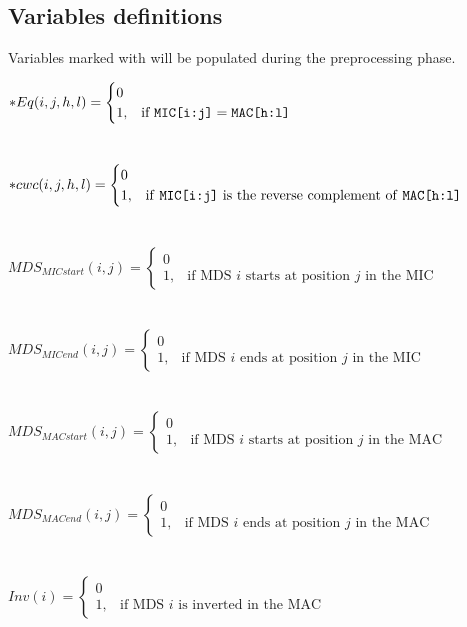 \subsection{Variables definitions}
Variables marked with \* will be populated during the preprocessing phase.

$*Eq(i,j,h,l) = \begin{cases} 0 \\ 1, & \mbox{if } \texttt{MIC[i:j]} = \texttt{MAC[h:l]} \end{cases}$ \\\\\\
$*cwc(i,j,h,l) = \begin{cases} 0 \\ 1, & \mbox{if \texttt{MIC[i:j]} is the reverse complement of \texttt{MAC[h:l]}} \end{cases}$ \\\\\\
$MDS_{MICstart}(i,j) = \begin{cases} 0 \\ 1, & \mbox{if MDS } i\mbox{ starts at position } j \mbox{ in the MIC} \end{cases}$ \\\\\\
$MDS_{MICend}(i,j) = \begin{cases} 0 \\ 1, & \mbox{if MDS } i\mbox{ ends at position } j \mbox{ in the MIC} \end{cases}$ \\\\\\
$MDS_{MACstart}(i,j) = \begin{cases} 0 \\ 1, & \mbox{if MDS } i\mbox{ starts at position } j \mbox{ in the MAC} \end{cases}$ \\\\\\
$MDS_{MACend}(i,j) = \begin{cases} 0 \\ 1, & \mbox{if MDS } i\mbox{ ends at position } j \mbox{ in the MAC} \end{cases}$ \\\\\\
$Inv(i) = \begin{cases} 0 \\ 1, & \mbox{if MDS } i\mbox{ is inverted in the MAC } \end{cases}$ \\\\\\
